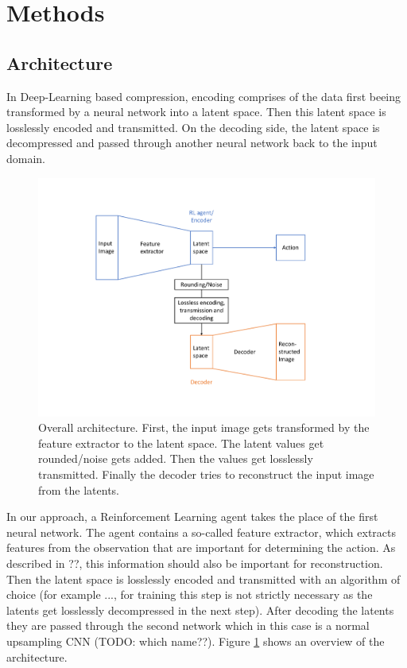 \section{Methods}

\subsection{Architecture}\label{methods:Architecture}
    In Deep-Learning based compression, encoding comprises of the data first
    beeing transformed by a neural network into a latent space. Then this latent
    space is losslessly encoded and transmitted. On the decoding side, the
    latent space is decompressed and passed through another neural network back
    to the input domain.

    \begin{figure}[H]
        \centering
        \includegraphics[width=0.8\linewidth]{img/architecture.pdf}
        \caption{Overall architecture. First, the input image gets transformed by the feature extractor to the latent space. The latent values get rounded/noise gets added. Then the values get losslessly transmitted. Finally the decoder tries to reconstruct the input image from the latents.}
        \label{fig:Architecture}
    \end{figure}

    In our approach, a Reinforcement Learning agent takes the place of the first
    neural network. The agent contains a so-called feature extractor, which
    extracts features from the observation that are important for determining
    the action. As described in ??, this information should also be important
    for reconstruction. Then the latent space is losslessly encoded and
    transmitted with an algorithm of choice (for example ..., for training this
    step is not strictly necessary as the latents get losslessly decompressed in
    the next step). After decoding the latents they are passed through the
    second network which in this case is a normal upsampling CNN (TODO: which name??). 
    Figure \ref{fig:Architecture} shows an overview of the architecture.

